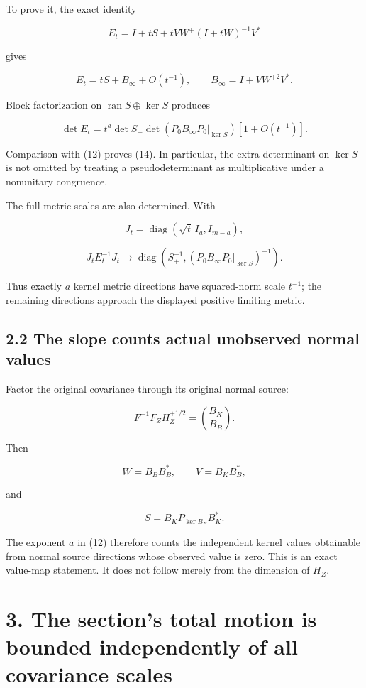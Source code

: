 \documentclass[11pt]{article}
\begin{document}
To prove it, the exact identity

\[
E_t
=
I+tS+tVW^+(I+tW)^{-1}V^*
\]

gives

\[
E_t=tS+B_\infty+O(t^{-1}),
\qquad
B_\infty=I+VW^{+2}V^*.
\]

Block factorization on \(\operatorname{ran}S\oplus\ker S\) produces

\[
\det E_t
=
t^a\det S_+\det(P_0B_\infty P_0|_{\ker S})
[1+O(t^{-1})].
\]

Comparison with (12) proves (14). In particular, the extra determinant on \(\ker S\) is not omitted by treating a pseudodeterminant as multiplicative under a nonunitary congruence.

The full metric scales are also determined. With

\[
J_t=\operatorname{diag}(\sqrt t\,I_a,I_{m-a}),
\]

\[
\boxed{
J_tE_t^{-1}J_t
\longrightarrow
\operatorname{diag}
\left(S_+^{-1},
(P_0B_\infty P_0|_{\ker S})^{-1}\right).
}
\tag{15}
\]

Thus exactly \(a\) kernel metric directions have squared-norm scale \(t^{-1}\); the remaining directions approach the displayed positive limiting metric.

\subsection{2.2 The slope counts actual unobserved normal values}\label{the-slope-counts-actual-unobserved-normal-values}

Factor the original covariance through its original normal source:

\[
F^{-1}F_ZH_Z^{+1/2}
=
\binom{B_K}{B_B}.
\]

Then

\[
W=B_BB_B^*,\qquad
V=B_KB_B^*,
\]

and

\[
\boxed{
S=B_KP_{\ker B_B}B_K^*.
}
\tag{16}
\]

The exponent \(a\) in (12) therefore counts the independent kernel values obtainable from normal source directions whose observed value is zero. This is an exact value-map statement. It does not follow merely from the dimension of \(H_Z\).

\section{3. The section's total motion is bounded independently of all covariance scales}\label{the-sections-total-motion-is-bounded-independently-of-all-covariance-scales}
\end{document}
